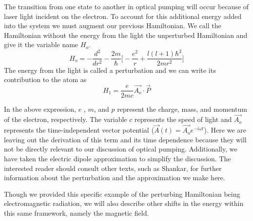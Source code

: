 \documentclass[12pt]{article}
\begin{document}
		The transition from one state to another in optical pumping
		will occur because of laser light incident on the electron.
		To account for this additional energy added into the system 
		we must augment
		our previous Hamiltonian. We call the Hamiltonian without 
		the energy from the light the unperturbed Hamiltonian and 
		give it the variable name $H_o$.
		\begin{equation}
			H_o=-\frac{d^2}{dr^2}-\frac{2m}{\hbar}\Big[-\frac{e^2}{r} + \frac{l(l+1)\hbar^2}{2mr^2}\Big]
		\end{equation}
		The energy from the light is called a perturbation and we
		can write its contribution to the atom as 
		\begin{equation}
			H_1=\frac{e}{2mc} \vec{A_o} \cdotp \vec{P}
		\end{equation}

		In the above expression, $e$ , $m$, and $p$ represent the charge, mass,
		and momentum of the electron, respectively. The variable $c$ represents
		the speed of light and $\vec{A_o}$ represents the time-independent 
		vector potential ($\vec{A}(t)=\vec{A_o}e^{-i\omega t}$). 
		Here we are leaving out the derivation of this term and
		its time dependence because they will not be directly 
		relevant to our discussion of optical pumping. Additionally, 
		we have taken the electric dipole approximation to simplify
		the discussion. 
		The interested reader should
		consult other texts, such as Shankar, for further information about the 
		perturbation and the approximation we make here. 

        Though we provided this specific example of the perturbing 
        Hamiltonian being electromagnetic radiation, we will also 
        describe other shifts in the energy within this same framework,
        namely the magnetic field.
\end{document}
